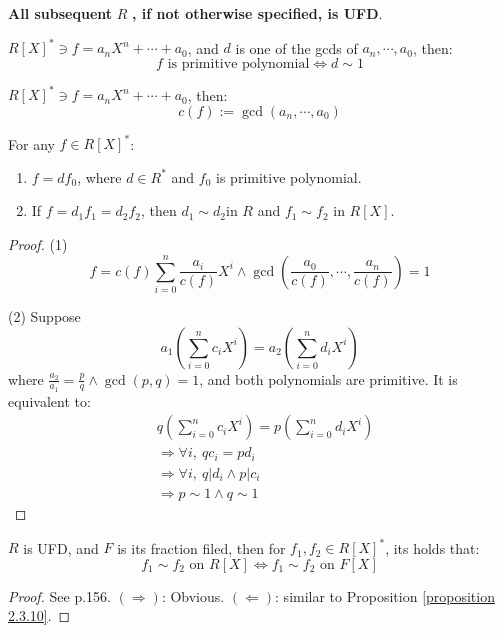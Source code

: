 \textbf{All subsequent} $R$ \textbf{, if not otherwise specified, is UFD}.


\begin{definition}
    $R[X]^* \ni f = a_n X^n + \cdots + a_0$, and $d$ is one of the gcds of $a_n, \cdots, a_0$, then:
    \[
        f \text{ is primitive polynomial} \Leftrightarrow d \sim 1
    \]
\end{definition}



\begin{definition}
    $R[X]^* \ni f = a_n X^n + \cdots + a_0$, then:
    \[
        c(f) := \gcd(a_n, \cdots, a_0)
    \]
\end{definition}




\begin{proposition}
    \label{proposition 2.3.10}
    For any $f \in R[X]^*$:
    \begin{enumerate}
        \item $f = df_0$, where $d \in R^*$ and $f_0$ is primitive polynomial.
        \item If $f = d_1 f_1 = d_2 f_2$, then $d_1 \sim d_2 $in $R$ and $f_1 \sim f_2 $ in $R[X]$.
    \end{enumerate}
\end{proposition}
\begin{proof}
    (1)
    \[
        f = c(f) \sum_{i=0}^n \frac{a_i}{c(f)} X^i \land \gcd\left( \frac{a_0}{c(f)}, \cdots, \frac{a_n}{c(f)} \right) = 1
    \]

    (2)
    Suppose
    \[
        a_1\left( \sum_{i=0}^{n} c_i X^i \right) = a_2\left( \sum_{i=0}^{n} d_i X^i \right)
    \]
    where $\frac{a_2}{a_1}  = \frac{p}{q} \land \gcd(p, q) = 1$, and both polynomials are primitive. It is equivalent to:
    \begin{align*}
        & q \left( \sum_{i=0}^{n} c_i X^i \right) =  p \left( \sum_{i=0}^{n} d_i X^i \right) \\
        & \Rightarrow \forall i ,\ q c_i = p d_i \\
        & \Rightarrow \forall i,\ q | d_i \land p | c_i \\
        & \Rightarrow p\sim 1 \land q \sim 1
    \end{align*}
\end{proof}


\begin{proposition}
    \label{proposition 2.3.11}
    $R$ is UFD, and $F$ is its fraction filed, then for $f_1, f_2 \in R[X]^*$, its holds that:
    \[
        f_1 \sim f_2 \text{ on } R[X] \Leftrightarrow  f_1 \sim f_2 \text{ on } F[X]
    \]
\end{proposition}
\begin{proof}
    See \cite{Qiu_MA} p.156. $(\Rightarrow)$: Obvious. $(\Leftarrow)$: similar to Proposition \ref{proposition 2.3.10}.
\end{proof}





